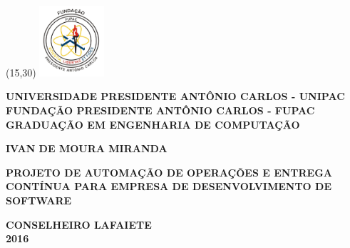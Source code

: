 \documentclass[
12pt,				%
openright,			%
oneside,			%
a4paper,			%
english,			%
french,				%
spanish,			%
brazil,				%
]{abntex2}
\begin{document}
	

\frenchspacing 


\renewcommand{\imprimircapa}{%
	\begin{capa}%
		\centering
		
		\begin{textblock}{20}(15,30)
			\includegraphics[width=2.4cm]{logo-unipac.jpg}
		\end{textblock}
		
		\begin{center}
			\textbf{UNIVERSIDADE PRESIDENTE ANTÔNIO CARLOS - UNIPAC}
			\\ \textbf{FUNDAÇÃO PRESIDENTE ANTÔNIO CARLOS - FUPAC}
			\\ \textbf{GRADUAÇÃO EM ENGENHARIA DE COMPUTAÇÃO}
		\end{center}
		
		\vspace*{\fill}
		
		\begin{center}
			\textbf{IVAN DE MOURA MIRANDA}
		\end{center}
		
		\vfill
		\begin{center}
			\textbf{PROJETO DE AUTOMAÇÃO DE OPERAÇÕES E ENTREGA CONTÍNUA PARA EMPRESA DE DESENVOLVIMENTO DE SOFTWARE}
		\end{center}
		\vfill
		
		\begin{center}
			\textbf{CONSELHEIRO LAFAIETE \\ 2016}
		\end{center}
		\vspace*{1cm}
	\end{capa}
}


\imprimircapa
\end{document}
